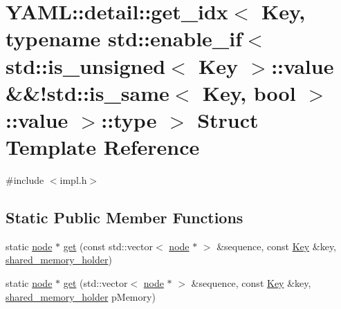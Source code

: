 \hypertarget{struct_y_a_m_l_1_1detail_1_1get__idx_3_01_key_00_01typename_01std_1_1enable__if_3_01std_1_1is__u08dca2a68e6a8b25fe3451a1a4ed02f5}{}\section{Y\+A\+ML\+::detail\+::get\+\_\+idx$<$ Key, typename std\+::enable\+\_\+if$<$ std\+::is\+\_\+unsigned$<$ Key $>$\+::value \&\&!std\+::is\+\_\+same$<$ Key, bool $>$\+::value $>$\+::type $>$ Struct Template Reference}
\label{struct_y_a_m_l_1_1detail_1_1get__idx_3_01_key_00_01typename_01std_1_1enable__if_3_01std_1_1is__u08dca2a68e6a8b25fe3451a1a4ed02f5}


{\ttfamily \#include $<$impl.\+h$>$}

\subsection*{Static Public Member Functions}
\begin{DoxyCompactItemize}
\item 
static \mbox{\hyperlink{class_y_a_m_l_1_1detail_1_1node}{node}} $\ast$ \mbox{\hyperlink{struct_y_a_m_l_1_1detail_1_1get__idx_3_01_key_00_01typename_01std_1_1enable__if_3_01std_1_1is__u08dca2a68e6a8b25fe3451a1a4ed02f5_a6e541515f0c135b2381965e66f422570}{get}} (const std\+::vector$<$ \mbox{\hyperlink{class_y_a_m_l_1_1detail_1_1node}{node}} $\ast$ $>$ \&sequence, const \mbox{\hyperlink{namespace_y_a_m_l_a67c320aa50d3de7ecba1d0b8775dd684a1af533fc24b0311b8c4d5ac2870283aa}{Key}} \&key, \mbox{\hyperlink{namespace_y_a_m_l_1_1detail_a228c4b3b6ba1058b474d40afc218e21d}{shared\+\_\+memory\+\_\+holder}})
\item 
static \mbox{\hyperlink{class_y_a_m_l_1_1detail_1_1node}{node}} $\ast$ \mbox{\hyperlink{struct_y_a_m_l_1_1detail_1_1get__idx_3_01_key_00_01typename_01std_1_1enable__if_3_01std_1_1is__u08dca2a68e6a8b25fe3451a1a4ed02f5_a2bb6c7b83286e26970bb21e5c635aced}{get}} (std\+::vector$<$ \mbox{\hyperlink{class_y_a_m_l_1_1detail_1_1node}{node}} $\ast$ $>$ \&sequence, const \mbox{\hyperlink{namespace_y_a_m_l_a67c320aa50d3de7ecba1d0b8775dd684a1af533fc24b0311b8c4d5ac2870283aa}{Key}} \&key, \mbox{\hyperlink{namespace_y_a_m_l_1_1detail_a228c4b3b6ba1058b474d40afc218e21d}{shared\+\_\+memory\+\_\+holder}} p\+Memory)
\end{DoxyCompactItemize}


